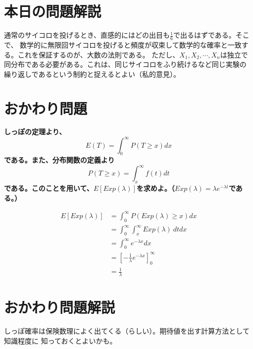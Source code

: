 \documentclass[a4j,uplatex,dvipdfmx]{jsarticle}
\begin{document}
\section*{本日の問題解説}
通常のサイコロを投げるとき、直感的にはどの出目も$\frac{1}{6}$で出るはずである。そこで、
数学的に無限回サイコロを投げると頻度が収束して数学的な確率と一致する。これを保証するのが、大数の法則である。
ただし、$X_1,X_2,\cdots,X_n$は独立で同分布である必要がある。これは、同じサイコロをふり続けるなど同じ実験の
繰り返しであるという制約と捉えるとよい（私的意見）。

\section*{おかわり問題}
\bf しっぽの定理\rm より、
\begin{equation}
  E(T)=\int_{0}^{\infty} P(T\ge x)dx
\end{equation}
である。また、分布関数の定義より
\begin{equation}
  P(T\ge x) = \int_{x}^{\infty} f(t)dt
\end{equation}
である。このことを用いて、$E[Exp(\lambda)]$を求めよ。（$Exp(\lambda)=\lambda e^{-\lambda t}$である。）

\begin{equation}
  \begin{split}
    E[Exp(\lambda)] &= \int_{0}^{\infty} P(Exp(\lambda)\ge x)dx \\
    &=\int_{0}^{\infty} \int_{x}^{\infty} Exp(\lambda)~ dt dx \\
    &= \int_{0}^{\infty} e^{-\lambda x} dx \\
    &= \left[ -\frac{1}{\lambda} e^{-\lambda x} \right]^{\infty}_0 \\
    &= \frac{1}{\lambda}
  \end{split}
\end{equation}

\section*{おかわり問題解説}
しっぽ確率は保険数理によく出てくる（らしい）。期待値を出す計算方法として知識程度に
知っておくとよいかも。
\end{document}
